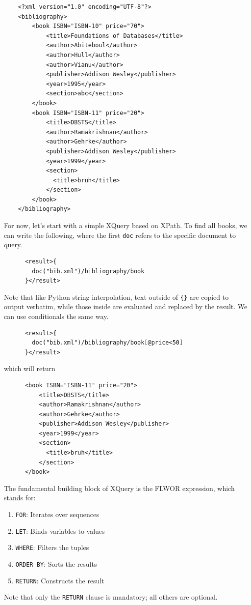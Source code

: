   \begin{lstlisting}
    <?xml version="1.0" encoding="UTF-8"?>
    <bibliography>
        <book ISBN="ISBN-10" price="70">
            <title>Foundations of Databases</title>
            <author>Abiteboul</author>
            <author>Hull</author>
            <author>Vianu</author>
            <publisher>Addison Wesley</publisher>
            <year>1995</year>
            <section>abc</section>
        </book>
        <book ISBN="ISBN-11" price="20">
            <title>DBSTS</title>
            <author>Ramakrishnan</author>
            <author>Gehrke</author>
            <publisher>Addison Wesley</publisher>
            <year>1999</year>
            <section>
              <title>bruh</title>
            </section>
        </book>
    </bibliography> 
  \end{lstlisting}

  \begin{example}
    \label{ex:a-first-xquery}
    For now, let's start with a simple XQuery based on XPath. To find all books, we can write the following, where the first \texttt{doc} refers to the specific document to query.
    \begin{lstlisting}
      <result>{
        doc("bib.xml")/bibliography/book
      }</result>
    \end{lstlisting}
    Note that like Python string interpolation, text outside of \texttt{\{\}} are copied to output verbatim, while those inside are evaluated and replaced by the result. We can use conditionals the same way. 
    \begin{lstlisting}
      <result>{
        doc("bib.xml")/bibliography/book[@price<50]
      }</result>
    \end{lstlisting}
    which will return 
    \begin{lstlisting}
      <book ISBN="ISBN-11" price="20">
          <title>DBSTS</title>
          <author>Ramakrishnan</author>
          <author>Gehrke</author>
          <publisher>Addison Wesley</publisher>
          <year>1999</year>
          <section>
            <title>bruh</title>
          </section>
      </book>
    \end{lstlisting}
  \end{example}

  \begin{definition}
    \label{def:flwor-expressions}
    The fundamental building block of XQuery is the FLWOR expression, which stands for:
    \begin{enumerate}
      \item \texttt{FOR}: Iterates over sequences
      \item \texttt{LET}: Binds variables to values
      \item \texttt{WHERE}: Filters the tuples
      \item \texttt{ORDER BY}: Sorts the results
      \item \texttt{RETURN}: Constructs the result
    \end{enumerate}
    Note that only the \texttt{RETURN} clause is mandatory; all others are optional.
  \end{definition}

